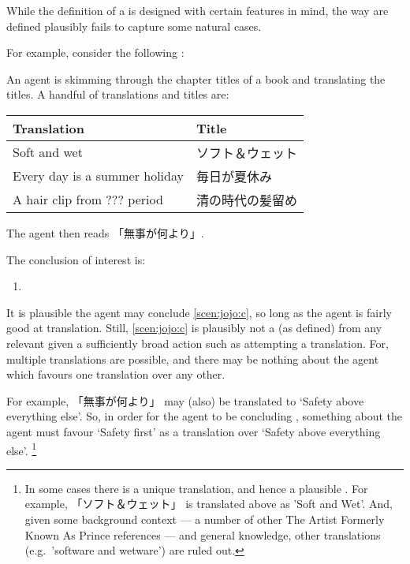 \begin{note}
  While the definition of a  is designed with certain features in mind, the way  are defined plausibly fails to capture some natural cases.

  For example, consider the following :

  \begin{scenario}[ジョジョリオン]%
    \label{scen:jojo}%
    \nocite{huangmufeiluyan:2011aa}%
    An agent is skimming through the chapter titles of a book and translating the titles.
    A handful of translations and titles are:

    \begin{center}
      \bgroup
      \def\arraystretch{1.125}
      \begin{tabular}{R{.45\textwidth} L{.45\textwidth}}
        Translation & Title \\
        \hline
        Soft and wet & ソフト＆ウェット \\
        Every day is a summer holiday & 毎日が夏休み \\
        A hair clip from ??? period & 清の時代の髪留め \\
      \end{tabular}
      \egroup
    \end{center}

    \noindent%
    The agent then reads 「無事が何より」.
  \end{scenario}

  \noindent%
  The conclusion of interest is:
  \begin{enumerate}[label=C\thescenarioCounter., ref=C\thescenarioCounter]
  \item
    \label{scen:jojo:c}
  \end{enumerate}

  \noindent%
  It is plausible the agent may conclude \ref{scen:jojo:c}, so long as the agent is fairly good at translation.
  Still, \ref{scen:jojo:c} is plausibly not a \fc{} (as defined) from any relevant \pool{} given a sufficiently broad action such as attempting a translation.
  For, multiple translations are possible, and there may be nothing about the agent which favours one translation over any other.

  For example, 「無事が何より」 may (also) be translated to `Safety above everything else'.
  So, in order for the agent to be concluding , something about the agent must favour `Safety first' as a translation over `Safety above everything else'.%
  \footnote{
    In some cases there is a unique translation, and hence a plausible \fc{}.
    For example, 「ソフト＆ウェット」 is translated above as 'Soft and Wet'.
    And, given some background context --- a number of other The Artist Formerly Known As Prince references --- and general knowledge, other translations (e.g.\ 'software and wetware') are ruled out.
  }
\end{note}


